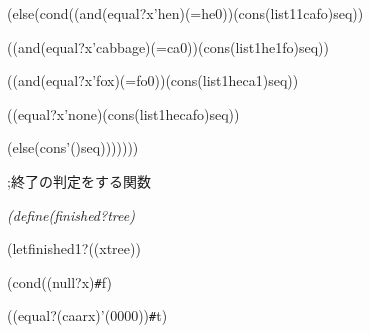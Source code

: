 \documentclass{article}
\begin{document}
\noindent
\mbox{}{\it {}\charwd}{\it {}\charwd}(else{\it {}\charwd}(cond{\it {}\charwd}((and{\it {}\charwd}(equal?{\it {}\charwd}x{\it {}\charwd}'hen){\it {}\charwd}(={\it {}\charwd}he{\it {}\charwd}0)){\it {}\charwd}(cons{\it {}\charwd}(list{\it {}\charwd}1{\it {}\charwd}1{\it {}\charwd}ca{\it {}\charwd}fo){\it {}\charwd}seq))

\noindent
\mbox{}{\it {}\charwd}{\it {}\charwd}{\it {}\charwd}((and{\it {}\charwd}(equal?{\it {}\charwd}x{\it {}\charwd}'cabbage){\it {}\charwd}(={\it {}\charwd}ca{\it {}\charwd}0)){\it {}\charwd}(cons{\it {}\charwd}(list{\it {}\charwd}1{\it {}\charwd}he{\it {}\charwd}1{\it {}\charwd}fo){\it {}\charwd}seq))

\noindent
\mbox{}{\it {}\charwd}{\it {}\charwd}{\it {}\charwd}((and{\it {}\charwd}(equal?{\it {}\charwd}x{\it {}\charwd}'fox){\it {}\charwd}(={\it {}\charwd}fo{\it {}\charwd}0)){\it {}\charwd}(cons{\it {}\charwd}(list{\it {}\charwd}1{\it {}\charwd}he{\it {}\charwd}ca{\it {}\charwd}1){\it {}\charwd}seq))

\noindent
\mbox{}{\it {}\charwd}{\it {}\charwd}{\it {}\charwd}((equal?{\it {}\charwd}x{\it {}\charwd}'none){\it {}\charwd}(cons{\it {}\charwd}(list{\it {}\charwd}1{\it {}\charwd}he{\it {}\charwd}ca{\it {}\charwd}fo){\it {}\charwd}seq))

\noindent
\mbox{}{\it {}\charwd}{\it {}\charwd}{\it {}\charwd}(else{\it {}\charwd}(cons{\it {}\charwd}'(){\it {}\charwd}seq)))))))

\noindent
\mbox{}\hfill

\noindent
\mbox{}\rm\mc \rm\mc %

\noindent
\mbox{};\charwd 終了の判定をする関数

\noindent
\mbox{}\sl (define{\sl {}\charwd}(finished?{\sl {}\charwd}tree)

\noindent
\mbox{}{\sl {}\charwd}(let{\sl {}\charwd}finished1?{\sl {}\charwd}((x{\sl {}\charwd}tree))

\noindent
\mbox{}{\sl {}\charwd}(cond{\sl {}\charwd}((null?{\sl {}\charwd}x){\sl {}\charwd}{\tt\#}f)

\noindent
\mbox{}{\sl {}\charwd}{\sl {}\charwd}((equal?{\sl {}\charwd}(caar{\sl {}\charwd}x){\sl {}\charwd}'(0{\sl {}\charwd}0{\sl {}\charwd}0{\sl {}\charwd}0)){\sl {}\charwd}{\tt\#}t)
\end{document}
